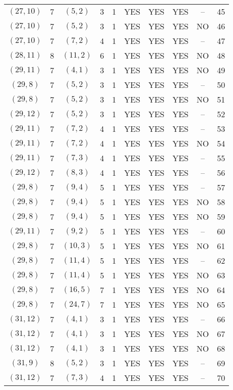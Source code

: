 \begin{longtable}{|c|c|c|c|c|c|c|c|c|c|}
$(27, 10)$ & 7 & $(5, 2)$ & 3 & 1 & YES & YES & YES & -- & 45\\
$(27, 10)$ & 7 & $(5, 2)$ & 3 & 1 & YES & YES & YES & NO & 46\\
$(27, 10)$ & 7 & $(7, 2)$ & 4 & 1 & YES & YES & YES & -- & 47\\
$(28, 11)$ & 8 & $(11, 2)$ & 6 & 1 & YES & YES & YES & NO & 48\\
$(29, 11)$ & 7 & $(4, 1)$ & 3 & 1 & YES & YES & YES & NO & 49\\
$(29, 8)$ & 7 & $(5, 2)$ & 3 & 1 & YES & YES & YES & -- & 50\\
$(29, 8)$ & 7 & $(5, 2)$ & 3 & 1 & YES & YES & YES & NO & 51\\
$(29, 12)$ & 7 & $(5, 2)$ & 3 & 1 & YES & YES & YES & -- & 52\\
$(29, 11)$ & 7 & $(7, 2)$ & 4 & 1 & YES & YES & YES & -- & 53\\
$(29, 11)$ & 7 & $(7, 2)$ & 4 & 1 & YES & YES & YES & NO & 54\\
$(29, 11)$ & 7 & $(7, 3)$ & 4 & 1 & YES & YES & YES & -- & 55\\
$(29, 12)$ & 7 & $(8, 3)$ & 4 & 1 & YES & YES & YES & -- & 56\\
$(29, 8)$ & 7 & $(9, 4)$ & 5 & 1 & YES & YES & YES & -- & 57\\
$(29, 8)$ & 7 & $(9, 4)$ & 5 & 1 & YES & YES & YES & NO & 58\\
$(29, 8)$ & 7 & $(9, 4)$ & 5 & 1 & YES & YES & YES & NO & 59\\
$(29, 11)$ & 7 & $(9, 2)$ & 5 & 1 & YES & YES & YES & -- & 60\\
$(29, 8)$ & 7 & $(10, 3)$ & 5 & 1 & YES & YES & YES & NO & 61\\
$(29, 8)$ & 7 & $(11, 4)$ & 5 & 1 & YES & YES & YES & -- & 62\\
$(29, 8)$ & 7 & $(11, 4)$ & 5 & 1 & YES & YES & YES & NO & 63\\
$(29, 8)$ & 7 & $(16, 5)$ & 7 & 1 & YES & YES & YES & NO & 64\\
$(29, 8)$ & 7 & $(24, 7)$ & 7 & 1 & YES & YES & YES & NO & 65\\
$(31, 12)$ & 7 & $(4, 1)$ & 3 & 1 & YES & YES & YES & -- & 66\\
$(31, 12)$ & 7 & $(4, 1)$ & 3 & 1 & YES & YES & YES & NO & 67\\
$(31, 12)$ & 7 & $(4, 1)$ & 3 & 1 & YES & YES & YES & NO & 68\\
$(31, 9)$ & 8 & $(5, 2)$ & 3 & 1 & YES & YES & YES & -- & 69\\
$(31, 12)$ & 7 & $(7, 3)$ & 4 & 1 & YES & YES & YES & -- & 70\\

\end{longtable}
